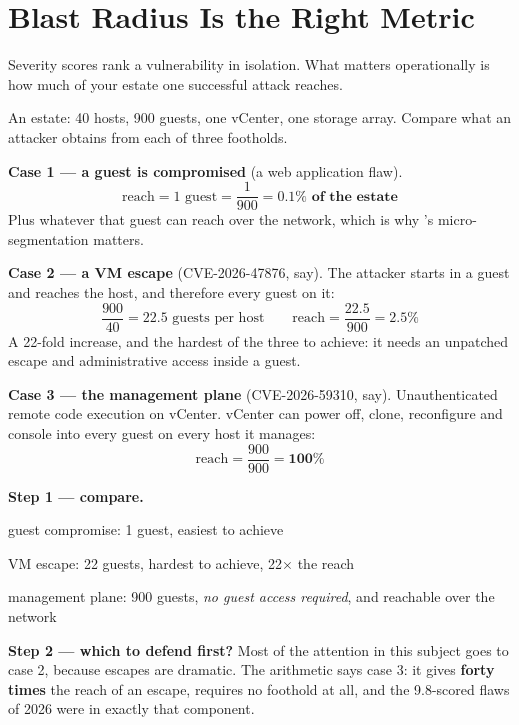 \section{Blast Radius Is the Right Metric}

Severity scores rank a vulnerability in isolation. What matters operationally
is how much of your estate one successful attack reaches.

\begin{worked}
An estate: 40 hosts, 900 guests, one vCenter, one storage array. Compare what
an attacker obtains from each of three footholds.

\smallskip
\textbf{Case 1 --- a guest is compromised} (a web application flaw).
\[ \text{reach} = 1 \text{ guest} = \frac{1}{900} = \mathbf{0.1\%
   \text{ of the estate}} \]
Plus whatever that guest can reach over the network, which is why
's micro-segmentation matters.

\smallskip
\textbf{Case 2 --- a VM escape} (CVE-2026-47876, say). The attacker starts in
a guest and reaches the host, and therefore every guest on it:
\[ \frac{900}{40} = 22.5 \text{ guests per host} \qquad
   \text{reach} = \frac{22.5}{900} = \mathbf{2.5\%} \]
A 22-fold increase, and the hardest of the three to achieve: it needs an
unpatched escape and administrative access inside a guest.

\smallskip
\textbf{Case 3 --- the management plane} (CVE-2026-59310, say). Unauthenticated
remote code execution on vCenter. vCenter can power off, clone, reconfigure and
console into every guest on every host it manages:
\[ \text{reach} = \frac{900}{900} = \mathbf{100\%} \]

\smallskip
\textbf{Step 1 --- compare.}
\begin{tight}
  \item guest compromise: 1 guest, easiest to achieve
  \item VM escape: 22 guests, hardest to achieve, 22$\times$ the reach
  \item management plane: 900 guests, \emph{no guest access required}, and
        reachable over the network
\end{tight}

\smallskip
\textbf{Step 2 --- which to defend first?} Most of the attention in this
subject goes to case 2, because escapes are dramatic. The arithmetic says case
3: it gives \textbf{forty times} the reach of an escape, requires no foothold
at all, and the 9.8-scored flaws of 2026 were in exactly that component.


\end{worked}
